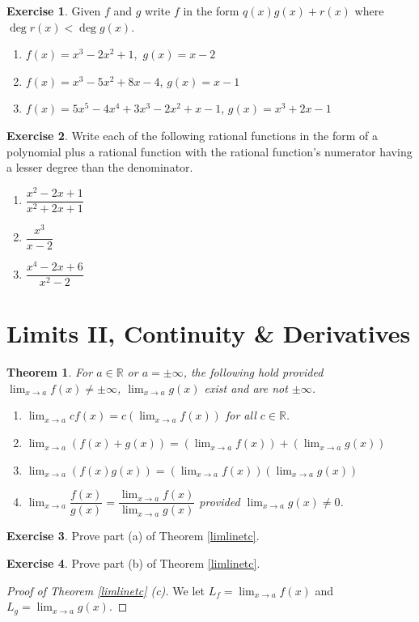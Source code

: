 \documentclass[english]{book}
\newcommand{\RR}{\mathbb{R}}
\newtheorem{theorem}{Theorem}[section]
\theoremstyle{remark}
\theoremstyle{definition}
\newtheorem{excs}{Exercise}
\newtheorem*{next week}{Next Week}
\newcommand{\dlim}{\displaystyle\lim}
\begin{document}
\begin{excs}
	Given $f$ and $g$ write $f$ in the form $q(x)g(x)+r(x)$ where $\deg r(x)<\deg g(x)$.
	\begin{enumerate}[label=\alph*)]
		\item $f(x)=x^3-2x^2+1,$ $g(x)=x-2$
		\item $f(x)=x^3-5x^2+8x-4$, $g(x)=x-1$
		\item $f(x)=5x^5-4x^4+3x^3-2x^2+x-1$,  $g(x)=x^3+2x-1$
		
	\end{enumerate}
\end{excs}
\begin{excs}
	Write each of the following rational functions in the form of a polynomial plus a rational function with the rational function's numerator having a lesser degree than the denominator.
	\begin{enumerate}[label=\alph*)]
		\item $\dfrac{x^2-2x+1}{x^2+2x+1}$
		\item $\dfrac{x^3}{x-2}$
		\item $\dfrac{x^4-2x+6}{x^2-2}$
	\end{enumerate}
\end{excs}
\section{Limits II, Continuity \& Derivatives}
\begin{theorem}
	For $a\in \RR$ or $a=\pm \infty$, the following hold provided $\dlim_{x\to a}f(x)\neq \pm \infty$, $\dlim_{x\to a} g(x)$ exist and are not $\pm \infty$. 
	\begin{enumerate}[label=(\alph*)]\label{limlinetc}
\item $\dlim_{x\to a}cf(x)=c\left(\dlim_{x\to a}f(x)\right)$ for all $c\in \RR$. 
\item $\dlim_{x\to a}\left(f(x)+g(x)\right)=\left(\dlim_{x\to a}f(x)\right)+\left(\dlim_{x\to a}g(x)\right)$
\item $\dlim_{x\to a} \left(f(x)g(x)\right)=\left(\dlim_{x\to a}f(x)\right)\left(\dlim_{x\to a}g(x)\right)$
\item $\dlim_{x\to a}\dfrac{f(x)}{g(x)}=\dfrac{\dlim_{x\to a} f(x)}{\dlim_{x\to a}g(x)}$ provided $\dlim_{x\to a}g(x)\neq 0$.
	\end{enumerate}\end{theorem}
\begin{excs}
	Prove part (a) of Theorem \ref{limlinetc}.
\end{excs}
\begin{excs}
Prove part (b) of Theorem \ref{limlinetc}.
\end{excs}
\begin{proof}[Proof of Theorem \ref{limlinetc} (c)]
	We let $L_f=\dlim_{x\to a}f(x)$ and $L_g=\dlim_{x\to a}g(x)$.
\end{proof}
\end{document}
